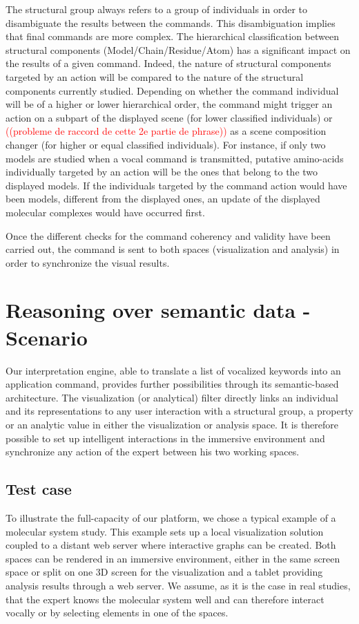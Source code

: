 \documentclass{vgtc}                          %
\newcommand*\mvb[1]{\textcolor{red}{#1}}
\begin{document}
The structural group always refers to a group of individuals in order to disambiguate the results between the commands. This disambiguation implies that final commands are more complex.
The hierarchical classification between structural components (Model/Chain/Residue/Atom) has a significant impact on the results of a given command. Indeed, the nature of structural components targeted by an action will be compared to the nature of the structural components currently studied. Depending on whether the command individual will be of a higher or lower hierarchical order, the command might trigger an action on a subpart of the displayed scene (for lower classified individuals) or \mvb{((probleme de raccord de cette 2e partie de phrase))} as a scene composition changer (for higher or equal classified individuals).
For instance, if only two models are studied when a vocal command is transmitted, putative amino-acids individually targeted by an action will be the ones that belong to the two displayed models. If the individuals targeted by the command action would have been models, different from the displayed ones, an update of the displayed molecular complexes would have occurred first.

Once the different checks for the command coherency and validity have been carried out, the command is sent to both spaces (visualization and analysis) in order to synchronize the visual results.

\section{Reasoning over semantic data - Scenario}

Our interpretation engine, able to translate a list of vocalized keywords into an application command, provides further possibilities through its semantic-based architecture. The visualization (or analytical) filter directly links an individual and its representations to any user interaction with a structural group, a property or an analytic value in either the visualization or analysis space. It is therefore possible to set up intelligent interactions in the immersive environment and synchronize any action of the expert between his two working spaces.

\subsection{Test case}

To illustrate the full-capacity of our platform, we chose a typical example of a molecular system study. This example sets up a local visualization solution coupled to a distant web server where interactive graphs can be created. Both spaces can be rendered in an immersive environment, either in the same screen space or split on one 3D screen for the visualization and a tablet providing analysis results through a web server. We assume, as it is the case in real studies, that the expert knows the molecular system well and can therefore interact vocally or by selecting elements in one of the spaces.
\end{document}
